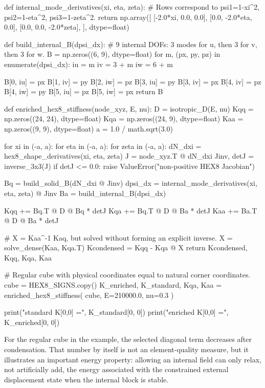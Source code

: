 \begin{python}
def internal_mode_derivatives(xi, eta, zeta):
    # Rows correspond to psi1=1-xi^2, psi2=1-eta^2, psi3=1-zeta^2.
    return np.array([
        [-2.0*xi, 0.0, 0.0],
        [0.0, -2.0*eta, 0.0],
        [0.0, 0.0, -2.0*zeta],
    ], dtype=float)


def build_internal_B(dpsi_dx):
    # 9 internal DOFs: 3 modes for u, then 3 for v, then 3 for w.
    B = np.zeros((6, 9), dtype=float)
    for m, (px, py, pz) in enumerate(dpsi_dx):
        iu = m
        iv = 3 + m
        iw = 6 + m

        B[0, iu] = px
        B[1, iv] = py
        B[2, iw] = pz
        B[3, iu] = py
        B[3, iv] = px
        B[4, iv] = pz
        B[4, iw] = py
        B[5, iu] = pz
        B[5, iw] = px
    return B


def enriched_hex8_stiffness(node_xyz, E, nu):
    D = isotropic_D(E, nu)
    Kqq = np.zeros((24, 24), dtype=float)
    Kqa = np.zeros((24, 9), dtype=float)
    Kaa = np.zeros((9, 9), dtype=float)
    a = 1.0 / math.sqrt(3.0)

    for xi in (-a, a):
        for eta in (-a, a):
            for zeta in (-a, a):
                dN_dxi = hex8_shape_derivatives(xi, eta, zeta)
                J = node_xyz.T @ dN_dxi
                Jinv, detJ = inverse_3x3(J)
                if detJ <= 0.0:
                    raise ValueError("non-positive HEX8 Jacobian")

                Bq = build_solid_B(dN_dxi @ Jinv)
                dpsi_dx = internal_mode_derivatives(xi, eta, zeta) @ Jinv
                Ba = build_internal_B(dpsi_dx)

                Kqq += Bq.T @ D @ Bq * detJ
                Kqa += Bq.T @ D @ Ba * detJ
                Kaa += Ba.T @ D @ Ba * detJ

    # X = Kaa^{-1} Kaq, but solved without forming an explicit inverse.
    X = solve_dense(Kaa, Kqa.T)
    Kcondensed = Kqq - Kqa @ X
    return Kcondensed, Kqq, Kqa, Kaa


# Regular cube with physical coordinates equal to natural corner coordinates.
cube = HEX8_SIGNS.copy()
K_enriched, K_standard, Kqa, Kaa = enriched_hex8_stiffness(
    cube, E=210000.0, nu=0.3
)

print("standard K[0,0] =", K_standard[0, 0])
print("enriched K[0,0] =", K_enriched[0, 0])
\end{python}

For the regular cube in the example, the selected diagonal term decreases after
condensation. That number by itself is not an element-quality measure, but it
illustrates an important energy property: allowing an internal field can only
relax, not artificially add, the energy associated with the constrained
external displacement state when the internal block is stable.

